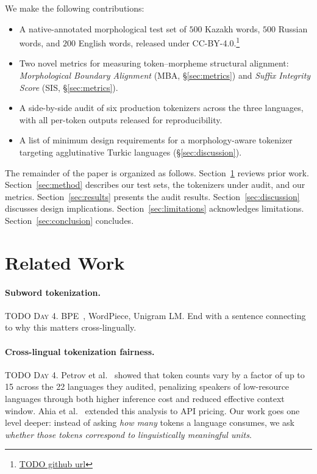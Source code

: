 \documentclass{article}
\begin{document}
We make the following contributions:
\begin{itemize}
  \item A native-annotated morphological test set of \(500\) Kazakh words,
        \(500\) Russian words, and \(200\) English words, released under
        CC-BY-4.0.\footnote{\url{TODO github url}}
  \item Two novel metrics for measuring token--morpheme structural alignment:
        \emph{Morphological Boundary Alignment} (MBA, \S\ref{sec:metrics}) and
        \emph{Suffix Integrity Score} (SIS, \S\ref{sec:metrics}).
  \item A side-by-side audit of six production tokenizers across the three
        languages, with all per-token outputs released for reproducibility.
  \item A list of minimum design requirements for a morphology-aware tokenizer
        targeting agglutinative Turkic languages (\S\ref{sec:discussion}).
\end{itemize}

The remainder of the paper is organized as follows.
Section~\ref{sec:related} reviews prior work.
Section~\ref{sec:method} describes our test sets, the tokenizers under audit, and our metrics.
Section~\ref{sec:results} presents the audit results.
Section~\ref{sec:discussion} discusses design implications.
Section~\ref{sec:limitations} acknowledges limitations.
Section~\ref{sec:conclusion} concludes.

\section{Related Work}
\label{sec:related}


\paragraph{Subword tokenization.}
\textsc{TODO Day 4.} BPE~\citep{sennrich2016bpe}, WordPiece, Unigram LM.
End with a sentence connecting to why this matters cross-lingually.

\paragraph{Cross-lingual tokenization fairness.}
\textsc{TODO Day 4.} Petrov et al.~\citep{petrov2023tokenizer} showed that token
counts vary by a factor of up to 15 across the 22 languages they audited,
penalizing speakers of low-resource languages through both higher inference cost
and reduced effective context window. Ahia et al.~\citep{ahia2023languages}
extended this analysis to API pricing. Our work goes one level deeper: instead of
asking \emph{how many} tokens a language consumes, we ask \emph{whether those tokens
correspond to linguistically meaningful units}.
\end{document}
